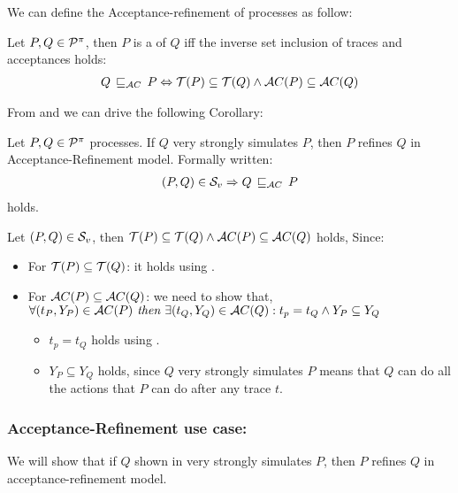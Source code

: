 We can define the Acceptance-refinement of \picalc{} processes as follow:

\begin{definition}
\label{def_failure_ref}
	Let $P,Q\in\mathcal P^{\pi}$, then $P$ is a  of $Q$ iff the inverse set inclusion of traces and acceptances holds:
\begin{align}
   Q \refiAC P \Leftrightarrow  \Traces[P]\subseteq\Traces[Q] \wedge \Accepatances[P]\subseteq\Accepatances[Q]
\end{align}
\end{definition}

From  and  we can drive the following Corollary: 

\begin{cor}
\label{cor_sim_acceptance_refinement}
Let $P,Q\in\mathcal P^{\pi}$ processes. If $Q$ very strongly simulates $P$, then $P$ refines $Q$ in Acceptance-Refinement model. Formally written:
\begin{align}
    (P,Q)\in{}\simuv \Rightarrow Q \refiAC P
   \label{acceptance_model}
\end{align}
holds.
\end{cor}%

\begin{prf}
Let $(P,Q)\in{}\mathcal{S}_v$, then $\Traces[P]\subseteq\Traces[Q] \wedge \Accepatances[P]\subseteq\Accepatances[Q]$ holds, Since:
\begin{itemize}
\item For $\Traces[P]\subseteq\Traces[Q]$: it holds using .
\item For $\Accepatances[P]\subseteq\Accepatances[Q]$: we need to show that,\\$\forall (t_P, Y_P) \in \Accepatances[P] \textit{ then } \exists (t_Q, Y_Q) \in \Accepatances[Q]: t_p = t_Q \wedge Y_P \subseteq Y_Q$
\begin{itemize}
\item $t_p = t_Q$ holds using .
\item $Y_P \subseteq Y_Q$ holds, since $Q$ very strongly simulates $P$ means that $Q$ can do all the actions that $P$ can do after any trace $t$.
\end{itemize}
\end{itemize}
\end{prf}
\subsubsection{Acceptance-Refinement use case:}
 We will show that if $Q$ shown in  very strongly simulates $P$, then $P$ refines $Q$ in acceptance-refinement model.
 
